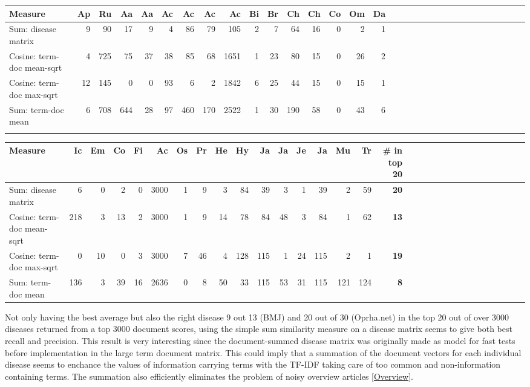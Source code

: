 \begin{table}[H]
\begin{tiny}
  \begin{tabular}{|l|r|r|r|r|r|r|r|r|r|r|r|r|r|r|r|r|r|r|r|r|r|r|r|r|r|r|r|r|r|r|r|}
    \hline
    Measure &Ap&Ru&Aa&Aa&Ac&Ac&Ac&Ac&Bi&Br&Ch&Ch&Co&Om&Da\\
    \hline
    Sum: disease matrix &9&90&17&9&4&86&79&105&2&7&64&16&0&2&1\\
    \hline
    Cosine: term-doc mean-sqrt &4&725&75&37&38&85&68&1651&1&23&80&15&0&26&2\\
    \hline
    Cosine: term-doc max-sqrt &12&145&0&0&93&6&2&1842&6&25&44&15&0&15&1\\
    \hline
    Sum: term-doc mean &6&708&644&28&97&460&170&2522&1&30&190&58&0&43&6 \\
    \hline
    \multicolumn{16}{c}{} \\
    \end{tabular}
    \begin{tabular}{|l|r|r|r|r|r|r|r|r|r|r|r|r|r|r|r|r|r|r|r|r|r|r|r|r|r|r|r|r|r|r|}
    \hline
     Measure &Ic&Em&Co&Fi&Ac&Os&Pr&He&Hy&Ja&Ja&Je&Ja&Mu&Tr &\scriptsize{\textbf{\# in top 20}} \\
    \hline
    Sum: disease matrix &6&0&2&0&3000&1&9&3&84&39&3&1&39&2&59 & \scriptsize{\textbf{20}} \\
    \hline
    Cosine: term-doc mean-sqrt &218&3&13&2&3000&1&9&14&78&84&48&3&84&1&62 & \scriptsize{\textbf{13}} \\
    \hline
    Cosine: term-doc max-sqrt &0&10&0&3&3000&7&46&4&128&115&1&24&115&2&1 & \scriptsize{\textbf{19}} \\
    \hline
    Sum: term-doc mean &136&3&39&16&2636&0&8&50&33&115&53&31&115&121&124 & \scriptsize{\textbf{8}} \\
    \hline
  \end{tabular}
\end{tiny}
\end{table}

Not only having the best average but also the right disease 9 out 13 (BMJ) and 20 out of 30 (Oprha.net) 
in the top 20 out of over 3000 diseases returned from a top 3000 document scores, using the simple sum 
similarity measure on a disease matrix seems to give both best recall and precision. This result is very 
interesting since the document-summed disease matrix was originally made as model for fast tests before 
implementation in the large term document matrix. This could imply that a summation of the document vectors 
for each individual disease seems to enchance the values of information carrying terms with the TF-IDF taking 
care of too common and non-information containing terms. The summation also efficiently eliminates the problem 
of noisy overview articles \ref{Overview}. \\

